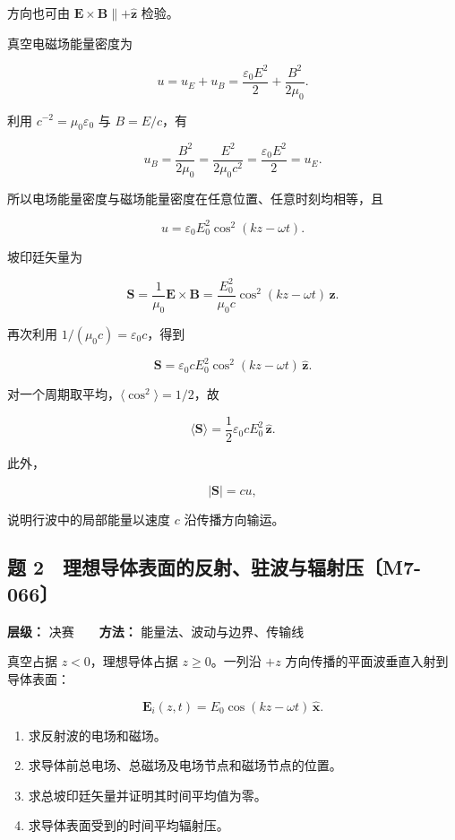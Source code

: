 方向也可由 \(\mathbf E\times\mathbf B\parallel+\hat{\mathbf z}\) 检验。

真空电磁场能量密度为

\[
u=u_E+u_B
=\frac{\varepsilon_0E^2}{2}
+\frac{B^2}{2\mu_0}.
\]

利用 \(c^{-2}=\mu_0\varepsilon_0\) 与 \(B=E/c\)，有

\[
u_B=\frac{B^2}{2\mu_0}
=\frac{E^2}{2\mu_0c^2}
=\frac{\varepsilon_0E^2}{2}
=u_E.
\]

所以电场能量密度与磁场能量密度在任意位置、任意时刻均相等，且

\[
\boxed{
u=\varepsilon_0E_0^2\cos^2(kz-\omega t)}.
\]

坡印廷矢量为

\[
\mathbf S
=\frac1{\mu_0}\mathbf E\times\mathbf B
=\frac{E_0^2}{\mu_0c}
\cos^2(kz-\omega t)\,\hat{\mathbf z}.
\]

再次利用 \(1/(\mu_0c)=\varepsilon_0c\)，得到

\[
\boxed{
\mathbf S
=\varepsilon_0cE_0^2
\cos^2(kz-\omega t)\,\hat{\mathbf z}}.
\]

对一个周期取平均，\(\langle\cos^2\rangle=1/2\)，故

\[
\boxed{
\langle\mathbf S\rangle
=\frac12\varepsilon_0cE_0^2\,\hat{\mathbf z}}.
\]

此外，

\[
|\mathbf S|=cu,
\]

说明行波中的局部能量以速度 \(c\) 沿传播方向输运。

\par{}
\noindent\begin{minipage}{\linewidth}

\subsection{题
2　理想导体表面的反射、驻波与辐射压〔M7-066〕}\label{m7:ux9898-2-ux7406ux60f3ux5bfcux4f53ux8868ux9762ux7684ux53cdux5c04ux9a7bux6ce2ux4e0eux8f90ux5c04ux538bm7-066}

\textbf{层级：} 决赛　　\textbf{方法：} 能量法、波动与边界、传输线

真空占据 \(z<0\)，理想导体占据 \(z\ge0\)。一列沿 \(+z\)
方向传播的平面波垂直入射到导体表面：

\[
\mathbf E_i(z,t)=E_0\cos(kz-\omega t)\,\hat{\mathbf x}.
\]

\begin{enumerate}
\def\labelenumi{(\arabic{enumi})}
\item
  求反射波的电场和磁场。
\item
  求导体前总电场、总磁场及电场节点和磁场节点的位置。
\item
  求总坡印廷矢量并证明其时间平均值为零。
\item
  求导体表面受到的时间平均辐射压。
\end{enumerate}

\end{minipage}\par

